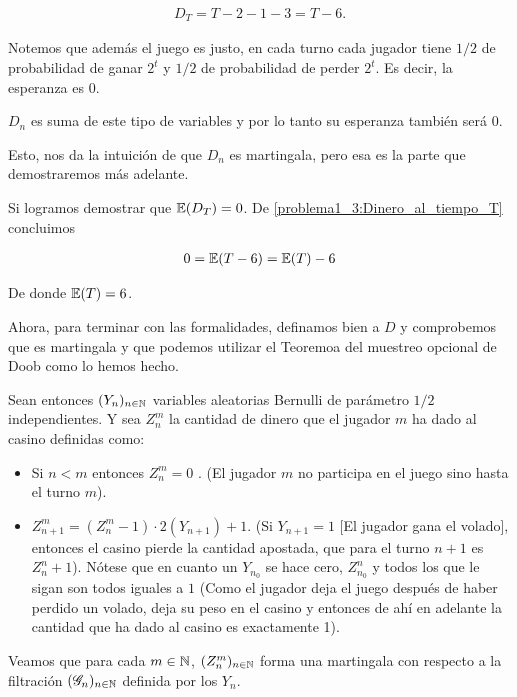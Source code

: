     \begin{align}\label{problema1_3:Dinero_al_tiempo_T}
		D_T = T-2 - 1 - 3 = T - 6. 
	\end{align}\pn					   
   
	Notemos que además el juego es justo, en cada turno cada jugador tiene $1/2$ de probabilidad de
	ganar $2^t$ y $1/2$ de probabilidad de perder $2^t$. Es decir, la esperanza es $0$.\pn
	
	$D_n$ es suma de este tipo de variables y por lo tanto su esperanza también será $0$.\pn
   
	Esto, nos da la intuición de que $D_n$ es martingala, pero esa es la parte que demostraremos más adelante.\pn
   
	Si logramos demostrar que $\mathbb{E}(D_T) = 0$. De \eqref{problema1_3:Dinero_al_tiempo_T} concluimos
	
    \begin{align}
		0 = \mathbb{E}(T - 6) = \mathbb{E}(T) - 6
	\end{align}
	
	De donde $\mathbb{E}(T) = 6$.\pn
	
	Ahora, para terminar con las formalidades, definamos bien a $D$ y comprobemos que es martingala y 
	que podemos utilizar el Teoremoa del muestreo opcional de Doob como lo hemos hecho.\pn
	
	Sean entonces $(Y_n)_{n \in \mathbb{N}}$ variables aleatorias Bernulli de parámetro $1/2$ independientes.
	Y sea $Z_n^m$ la cantidad de dinero que el jugador $m$ ha dado al casino definidas como:
	
	\begin{itemize}
		\item 
			Si $n < m$ entonces $Z_n^m = 0$ . (El jugador $m$ no participa en el juego sino hasta el turno $m$).
		\item
			$Z_{n+1}^{m} = (Z_n^{m} - 1) \cdot 2(Y_{n+1}) + 1$. (Si $Y_{n + 1} = 1$ [El jugador gana el volado], entonces el casino
			pierde la cantidad apostada, que para el turno $n+1$ es $Z_n^n + 1$). Nótese que en cuanto un $Y_{n_0}$ se hace cero,
			$Z_{n_0}^{n}$ y todos los que le sigan son todos iguales a $1$ (Como el jugador deja el juego después de haber perdido
			un volado, deja su peso en el casino y entonces de ahí en adelante la cantidad que ha dado al casino es exactamente 1).
	\end{itemize}\pn
	
	Veamos que para cada $m \in \mathbb{N}$, $(Z_n^m)_{n \in \mathbb{N}}$ forma una martingala con respecto a la filtración $(\mathscr{G}_n)_{n \in \mathbb{N}}$ 
	definida por los $Y_n$.\pn
	
